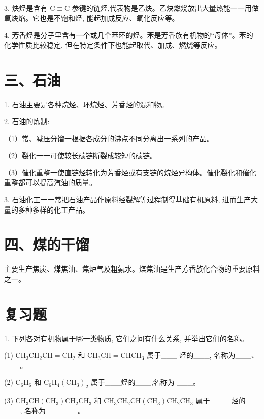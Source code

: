 \documentclass[10pt]{article}
\begin{document}
3. 炔烃是含有 \(\mathrm{C} \equiv \mathrm{C}\) 参键的链烃,代表物是乙炔。乙炔燃烧放出大量热能一一用做氧炔焰。它也是不饱和烃, 能起加成反应、氧化反应等。

4. 芳香烃是分子里含有一个或几个苯环的烃。苯是芳香族有机物的“母体”。苯的化学性质比较稳定, 但在特定条件下也能起取代、加成、燃烧等反应。

\section*{三、石油}

1. 石油主要是各种烷烃、环烷烃、芳香烃的混和物。

2. 石油的炼制:

（1）常、减压分馏一根据各成分的沸点不同分离出一系列的产品。

（2）裂化一一可使较长碳链断裂成较短的碳链。

（3）催化重整一使直链烃转化为芳香烃或有支链的烷烃异构体。催化裂化和催化重整都可以提高汽油的质量。

3. 石油化工一一常把石油产品作原料经裂解等过程制得基础有机原料, 进而生产大量的多种多样的化工产品。

\section*{四、煤的干馏}

主要生产焦炭、煤焦油、焦炉气及粗氨水。煤焦油是生产芳香族化合物的重要原料之一。

\section*{复习题}

1. 下列各对有机物属于哪一类物质, 它们之间有什么关系, 并举出它们的名称。

(1) \({\mathrm{{CH}}}_{3}{\mathrm{{CH}}}_{2}\mathrm{{CH}} = {\mathrm{{CH}}}_{2}\) 和 \({\mathrm{{CH}}}_{3}\mathrm{{CH}} = {\mathrm{{CHCH}}}_{3}\) 属于\_\_\_ 烃的\_\_\_, 名称为\_\_\_、\_\_\_。

(2) \({\mathrm{C}}_{6}{\mathrm{H}}_{6}\) 和 \({\mathrm{C}}_{6}{\mathrm{H}}_{4}{\left( {\mathrm{{CH}}}_{3}\right) }_{2}\) 属于\_\_\_烃的\_\_\_,名称为 \_\_\_。

(3) \({\mathrm{{CH}}}_{3}\mathrm{{CH}}\left( {\mathrm{{CH}}}_{3}\right) {\mathrm{{CH}}}_{2}{\mathrm{{CH}}}_{3}\) 和 \({\mathrm{{CH}}}_{3}{\mathrm{{CH}}}_{2}\mathrm{{CH}}\left( {\mathrm{{CH}}}_{3}\right) {\mathrm{{CH}}}_{2}{\mathrm{{CH}}}_{3}\) 属于\_\_\_\_烃的\_\_\_, 名称为\_\_\_\_\_\_。
\end{document}
